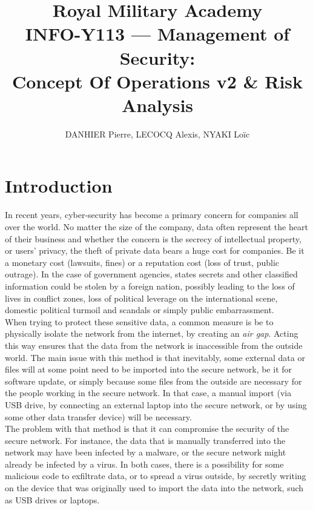 \documentclass[a4paper,11pt]{article}
\title{Royal Military Academy\\
	INFO-Y113 --- Management of Security: \\
	Concept Of Operations v2 \& Risk Analysis}
\author{DANHIER Pierre, LECOCQ Alexis, NYAKI Loïc}
\begin{document}
\maketitle
\newpage
\tableofcontents

\newpage

\section{Introduction}
In recent years, cyber-security has become a primary concern for companies all over the world. No matter the size of the company, data often represent the heart of their business and whether the concern is the secrecy of intellectual property, or users' privacy, the theft of private data bears a huge cost for companies. Be it a monetary cost (lawsuits, fines) or a reputation cost (loss of trust, public outrage). In the case of government agencies, states secrets and other classified information could be stolen by a foreign nation, possibly leading to the loss of lives in conflict zones, loss of political leverage on the international scene, domestic political turmoil and scandals or simply public embarrassment.\\

When trying to protect these sensitive data, a common measure is be to physically isolate the network from the internet, by creating an \textit{air gap}. Acting this way ensures that the data from the network is inaccessible from the outside world. The main issue with this method is that inevitably, some external data or files will at some point need to be imported into the secure network, be it for software update, or simply because some files from the outside are necessary for the people working in the secure network. In that case, a manual import (via USB drive, by connecting an external laptop into the secure network, or by using some other data transfer device) will be necessary.\\

The problem with that method is that it can compromise the security of the secure network. For instance, the data that is manually transferred into the network may have been infected by a malware, or the secure network might already be infected by a virus. In both cases, there is a possibility for some malicious code to exfiltrate data, or to spread a virus outside, by secretly writing on the device that was originally used to import the data into the network, such as USB drives or laptops.\\
\end{document}
